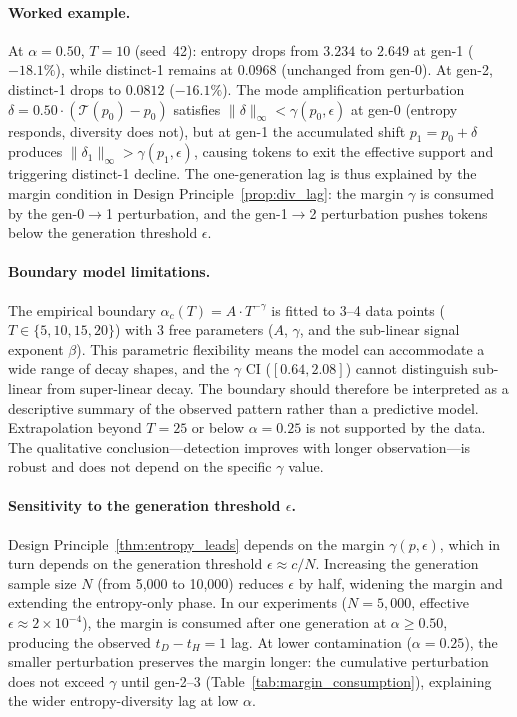 \paragraph{Worked example.}
At $\alpha{=}0.50$, $T{=}10$ (seed~42): entropy drops from $3.234$ to $2.649$ at gen-1 ($-18.1\%$), while distinct-1 remains at $0.0968$ (unchanged from gen-0).
At gen-2, distinct-1 drops to $0.0812$ ($-16.1\%$).
The mode amplification perturbation $\delta = 0.50 \cdot (\mathcal{T}(p_0) - p_0)$ satisfies $\|\delta\|_\infty < \gamma(p_0, \epsilon)$ at gen-0 (entropy responds, diversity does not), but at gen-1 the accumulated shift $p_1 = p_0 + \delta$ produces $\|\delta_1\|_\infty > \gamma(p_1, \epsilon)$, causing tokens to exit the effective support and triggering distinct-1 decline.
The one-generation lag is thus explained by the margin condition in Design Principle~\ref{prop:div_lag}: the margin $\gamma$ is consumed by the gen-0$\to$1 perturbation, and the gen-1$\to$2 perturbation pushes tokens below the generation threshold $\epsilon$.

\paragraph{Boundary model limitations.}
The empirical boundary $\alpha_c(T) = A \cdot T^{-\gamma}$ is fitted to 3--4 data points ($T \in \{5, 10, 15, 20\}$) with 3 free parameters ($A$, $\gamma$, and the sub-linear signal exponent $\beta$).
This parametric flexibility means the model can accommodate a wide range of decay shapes, and the $\gamma$ CI ($[0.64, 2.08]$) cannot distinguish sub-linear from super-linear decay.
The boundary should therefore be interpreted as a descriptive summary of the observed pattern rather than a predictive model.
Extrapolation beyond $T{=}25$ or below $\alpha{=}0.25$ is not supported by the data.
The qualitative conclusion---detection improves with longer observation---is robust and does not depend on the specific $\gamma$ value.

\paragraph{Sensitivity to the generation threshold $\epsilon$.}
Design Principle~\ref{thm:entropy_leads} depends on the margin $\gamma(p, \epsilon)$, which in turn depends on the generation threshold $\epsilon \approx c/N$.
Increasing the generation sample size $N$ (from 5{,}000 to 10{,}000) reduces $\epsilon$ by half, widening the margin and extending the entropy-only phase.
In our experiments ($N{=}5{,}000$, effective $\epsilon \approx 2 \times 10^{-4}$), the margin is consumed after one generation at $\alpha{\geq}0.50$, producing the observed $t_D - t_H = 1$ lag.
At lower contamination ($\alpha{=}0.25$), the smaller perturbation preserves the margin longer: the cumulative perturbation does not exceed $\gamma$ until gen-2--3 (Table~\ref{tab:margin_consumption}), explaining the wider entropy-diversity lag at low $\alpha$.


